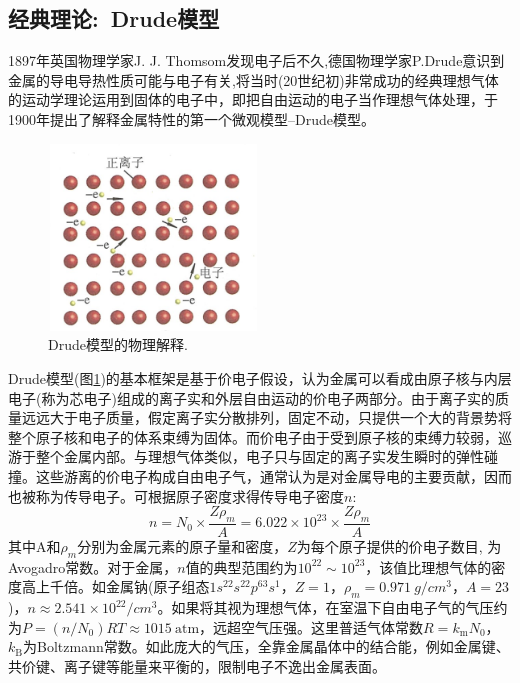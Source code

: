 \subsection{经典理论:~Drude模型}
1897年英国物理学家J. J. Thomsom发现电子后不久,德国物理学家P.Drude意识到金属的导电导热性质可能与电子有关,将当时(20世纪初)非常成功的经典理想气体的运动学理论运用到固体的电子中，即把自由运动的电子当作理想气体处理，于1900年提出了解释金属特性的第一个微观模型--Drude模型。
\begin{figure}[h!]
\centering
\vspace*{-0.05in}
\includegraphics[height=1.95in,width=2.20in,viewport=0 0 60 55,clip]{Figures/Drude_Model.png}
\caption{\small \textrm{Drude模型的物理解释.}}%
\label{Fig:Drude_model}
\end{figure} 
Drude模型(图\ref{Fig:Drude_model})的基本框架是基于价电子假设，认为金属可以看成由原子核与内层电子(称为芯电子)组成的离子实和外层自由运动的价电子两部分。由于离子实的质量远远大于电子质量，假定离子实分散排列，固定不动，只提供一个大的背景势将整个原子核和电子的体系束缚为固体。而价电子由于受到原子核的束缚力较弱，巡游于整个金属内部。与理想气体类似，电子只与固定的离子实发生瞬时的弹性碰撞。这些游离的价电子构成自由电子气，通常认为是对金属导电的主要贡献，因而也被称为传导电子。可根据原子密度求得传导电子密度$n$:
\begin{equation}
	n=N_0\times\dfrac{Z\rho_m}A=6.022\times10^{23}\times\dfrac{Z\rho_m}A
	\label{eq:valence_density}
\end{equation}
其中A和$\rho_m$分别为金属元素的原子量和密度，$Z$为每个原子提供的价电子数目, 为Avogadro常数。对于金属，$n$值的典型范围约为$10^{22}\sim10^{23}$，该值比理想气体的密度高上千倍。如金属钠(原子组态$1s^22s^22p^63s^1$，$Z=1$，$\rho_m=0.971~g/cm^3$，$A=23$)，$n\approx2.541\times10^{22}/cm^3$。如果将其视为理想气体，在室温下自由电子气的气压约为$P=(n/N_0)RT\approx1015~\mathrm{atm}$，远超空气压强。这里普适气体常数$R=k_{\mathrm{m}}N_0$，$k_{\mathrm{B}}$为Boltzmann常数。如此庞大的气压，全靠金属晶体中的结合能，例如金属键、共价键、离子键等能量来平衡的，限制电子不逸出金属表面。


